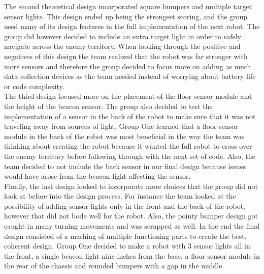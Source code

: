 \documentclass{article}
\begin{document}
The second theoretical design incorporated square bumpers and multiple target sensor lights. This design ended up being the strongest scoring, and the group used many of its design features in the full implementation of the next robot. The group did however decided to include an extra target light in order to safely navigate across the enemy territory. When looking through the positive and negatives of this design the team realized that the robot was far stronger with more sensors and therefore the group decided to focus more on adding as much data collection devices as the team needed instead of worrying about battery life or code complexity.\\

The third design  focused more on the placement of the floor sensor module and the height of the beacon sensor. The group also decided to test the implementation of a sensor in the back of the robot to make sure that it was not traveling away from sources of light. Group One learned that a floor sensor module in the back of the robot was most beneficial in the way the team was thinking about creating the robot because it wanted the full robot to cross over the enemy territory before following through with the next set of code. Also, the team decided to not include the back sensor in our final design because issues would have arose from the beacon light affecting the sensor.\\

Finally, the last design looked to incorporate more choices that the group did not look at before into the design process. For instance the team looked at the possibility of adding sensor lights only in the front and the back of the robot, however that did not bode well for the robot. Also, the pointy bumper design got caught in many turning movements and was scrapped as well. In the end the final design consisted of a mashing of multiple functioning parts to create the best, coherent design. Group One decided to make a robot with 3 sensor lights all in the front, a single beacon light nine inches from the base, a floor sensor module in the rear of the chassis and rounded bumpers with a gap in the middle. \\
\end{document}
